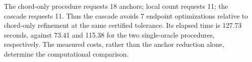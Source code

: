 The chord-only procedure requests 18 anchors; local count requests 11; the cascade requests 11. Thus the cascade avoids 7 endpoint optimizations relative to chord-only refinement at the same certified tolerance. Its elapsed time is 127.73 seconds, against 73.41 and 115.38 for the two single-oracle procedures, respectively. The measured costs, rather than the anchor reduction alone, determine the computational comparison.
